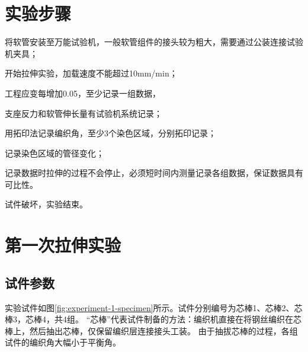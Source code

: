 \section{实验步骤}

\begin{compactenum}
	\item 将软管安装至万能试验机，一般软管组件的接头较为粗大，需要通过公装连接试验机夹具；
	\item 开始拉伸实验，加载速度不能超过10mm/min；
	\item 工程应变每增加0.05，至少记录一组数据，
	\begin{compactitem}
		\item 支座反力和软管伸长量有试验机系统记录；
		\item 用拓印法记录编织角，至少3个染色区域，分别拓印记录；
		\item 记录染色区域的管径变化；
		\item 记录数据时拉伸的过程不会停止，必须短时间内测量记录各组数据，保证数据具有可比性。
	\end{compactitem}
	\item 试件破坏，实验结束。
\end{compactenum}





\section{第一次拉伸实验}
\subsection{试件参数}
 实验试件如图\ref{fig:experiment-1-specimen}所示。试件分别编号为芯棒1、芯棒2、芯棒3，芯棒4，共4组。
 “芯棒”代表试件制备的方法：编织机直接在将钢丝编织在芯棒上，然后抽出芯棒，仅保留编织层连接接头工装。
由于抽拔芯棒的过程，各组试件的编织角大幅小于平衡角。



